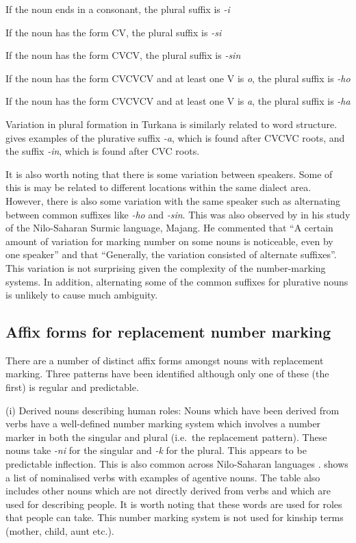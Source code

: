 \documentclass[output=paper]{langsci/langscibook}
\begin{document}
\ea\label{ex:moodie:3} If the noun ends in a consonant, the plural suffix is \textit{-i}

If the noun has the form CV, the plural suffix is \textit{-si} 

If the noun has the form CVCV, the plural suffix is \textit{-sin} 

If the noun has the form CVCVCV and at least one V is\textit{ o}, the plural suffix is \textit{-ho} 

If the noun has the form CVCVCV and at least one V is \textit{a}, the plural suffix is \textit{-ha} 
\z

Variation in plural formation in Turkana is similarly related to word structure. \citet[235]{Dimmendaal2000} gives examples of the plurative suffix \textit{-a}, which is found after CVCVC roots, and the suffix \textit{-in}, which is found after CVC roots. 

It is also worth noting that there is some variation between speakers. Some of this is may be related to different locations within the same dialect area. However, there is also some variation with the same speaker such as alternating between common suffixes like \textit{-ho} and \textit{-sin}. This was also observed by \citet[76]{Unseth1988} in his study of the Nilo-Saharan Surmic language, Majang. He commented that “A certain amount of variation for marking number on some nouns is noticeable, even by one speaker” and that “Generally, the variation consisted of alternate suffixes”. This variation is not surprising given the complexity of the number-marking systems. In addition, alternating some of the common suffixes for plurative nouns is unlikely to cause much ambiguity.

\subsection{Affix forms for replacement number marking} \label{sec:moodie:4.3}

There are a number of distinct affix forms amongst nouns with replacement marking. Three patterns have been identified although only one of these (the first) is regular and predictable.

(i) Derived nouns describing human roles: Nouns which have been derived from verbs have a well-defined number marking system which involves a number marker in both the singular and plural (i.e.\ the replacement pattern). These nouns take \textit{-ni }for the singular and \textit{-k} for the plural. This appears to be predictable inflection. This is also common across Nilo-Saharan languages \citep[243]{Dimmendaal2000}.  shows a list of nominalised verbs with examples of agentive nouns. The table also includes other nouns which are not directly derived from verbs and which are used for describing people. It is worth noting that these words are used for roles that people can take. This number marking system is not used for kinship terms (mother, child, aunt etc.). 
\end{document}
